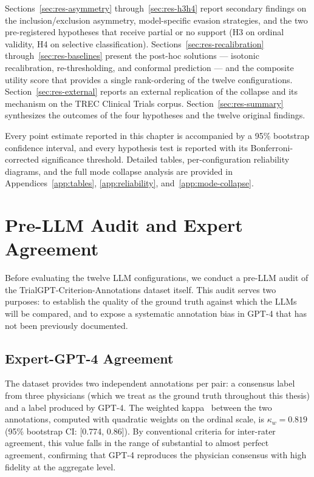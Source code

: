 Sections~\ref{sec:res-asymmetry} through~\ref{sec:res-h3h4} report 
secondary findings on the inclusion/exclusion asymmetry, model-specific 
evasion strategies, and the two pre-registered hypotheses that receive 
partial or no support (H3 on ordinal validity, H4 on selective 
classification). Sections~\ref{sec:res-recalibration} 
through~\ref{sec:res-baselines} present the post-hoc solutions --- 
isotonic recalibration, re-thresholding, and conformal prediction --- 
and the composite utility score that provides a single rank-ordering of 
the twelve configurations. Section~\ref{sec:res-external} reports an 
external replication of the collapse and its mechanism on the TREC 
Clinical Trials corpus. Section~\ref{sec:res-summary} synthesizes the 
outcomes of the four hypotheses and the twelve original findings.

Every point estimate reported in this chapter is accompanied by a 95\% 
bootstrap confidence interval, and every hypothesis test is reported 
with its Bonferroni-corrected significance threshold. Detailed tables, 
per-configuration reliability diagrams, and the full mode collapse 
analysis are provided in Appendices~\ref{app:tables}, 
\ref{app:reliability}, and~\ref{app:mode-collapse}.
\section{Pre-LLM Audit and Expert Agreement}
\label{sec:res-audit}

Before evaluating the twelve LLM configurations, we conduct a pre-LLM 
audit of the TrialGPT-Criterion-Annotations dataset itself. This audit 
serves two purposes: to establish the quality of the ground truth against 
which the LLMs will be compared, and to expose a systematic annotation 
bias in GPT-4 that has not been previously documented.

\subsection{Expert-GPT-4 Agreement}
\label{subsec:res-audit-kappa}

The dataset provides two independent annotations per pair: a consensus 
label from three physicians (which we treat as the ground truth 
throughout this thesis) and a label produced by GPT-4. The weighted 
kappa~\cite{cohen1968} between the two annotations, computed with 
quadratic weights on the ordinal scale, is $\kappa_w = 0.819$ 
(95\% bootstrap CI: [0.774, 0.86]). By conventional criteria for 
inter-rater agreement, this value falls in the range of substantial to 
almost perfect agreement, confirming that GPT-4 reproduces the 
physician consensus with high fidelity at the aggregate level.

